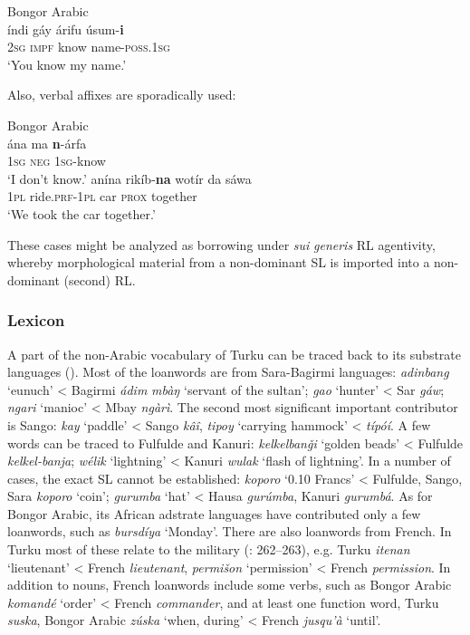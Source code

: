 \documentclass[output=paper]{langsci/langscibook}
\begin{document}
\ea
{Bongor Arabic \citep[180]{Luffin2013}}\\
\gll    índi gáy árifu úsum-\textbf{i} \\
        2\textsc{sg} \textsc{impf} know name-\textsc{poss}.1\textsc{sg}\\
\glt    `You know my name.'
\z
 
\noindent Also, verbal affixes are sporadically used:

\newpage
\ea
{Bongor Arabic \citep[181]{Luffin2013}}\\
\ea
\gll ána ma \textbf{n}-árfa \\
         1\textsc{sg} \textsc{neg} 1\textsc{sg}-know\\
\glt    `I don’t know.'
\ex
\gll  anína rikíb-\textbf{na} wotír da sáwa \\
         1\textsc{pl} ride.\textsc{prf}-1\textsc{pl} car \textsc{prox} together\\
\glt    `We took the car together.’
\z
\z
 
{These cases might be analyzed as borrowing under \textit{sui} \textit{generis} RL agentivity, whereby morphological material from a non-dominant SL is imported into a non-dominant (second) RL.}


 \subsubsection{Lexicon}

A part of the non-Arabic vocabulary of Turku can be traced back to its substrate languages (\citealt{Avram2019}). Most of the loanwords are from Sara-Bagirmi languages: \textit{adinbang} ‘eunuch’ < Bagirmi \textit{ádim} \textit{mbàŋ} ‘servant of the sultan’; \textit{gao} ‘hunter’ < Sar \textit{gáw}; \textit{ngari} ‘manioc’ < Mbay \textit{ngàrì}. The second most significant important contributor is Sango: \textit{kay} ‘paddle’ < Sango \textit{kâî}, \textit{tipoy} ‘carrying hammock’ < \textit{típóí}. A few words can be traced to Fulfulde and Kanuri: \textit{kelkelbanǧi} ‘golden beads’ < Fulfulde \textit{kelkel-banja}; \textit{wélik} ‘lightning’ < Kanuri \textit{wulak} ‘flash of lightning’. In a number of cases, the exact SL cannot be established: \textit{koporo} ‘0.10 Francs’ < Fulfulde, Sango, Sara \textit{koporo} ‘coin’; \textit{gurumba} ‘hat’ < Hausa \textit{gurúmba}, Kanuri \textit{gurumbá}. As for Bongor Arabic, its African adstrate languages have contributed only a few loanwords, such as \textit{bursdíya} ‘Monday’. There are also loanwords from French. In Turku most of these relate to the military (\citealt{ToscoOwens1993}: 262–263), e.g. Turku \textit{itenan} ‘lieutenant’ < French \textit{lieutenant}, \textit{permišon} ‘permission’ < French \textit{permission}. In addition to nouns, French loanwords include some verbs, such as Bongor Arabic \textit{komandé} ‘order’ < French \textit{commander}, and at least one function word, Turku \textit{suska}, Bongor Arabic \textit{zúska} ‘when, during’ < French \textit{jusqu’à} ‘until’.
\end{document}
